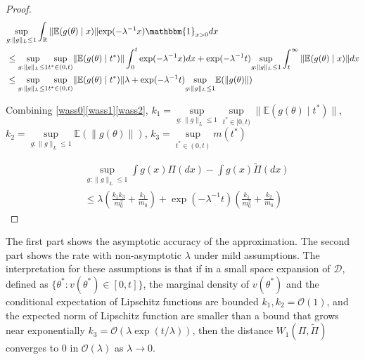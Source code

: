 \documentclass[10pt,fleqn]{article}
\newcommand{\mc}[1]{\mathcal{#1}}
\DeclareMathOperator{\1}{\mathbbm{1}}
\begin{document}
\begin{proof}[Proof]
\begin{equation}
\label{wass2}
\begin{aligned}
& \underset{g:\|g\|_L\le 1}\sup\int_\mathbb{R}  \|\mathbb{E}(g(\theta) \mid x)\| { \exp(- \lambda^{-1} x)}  \mathbbm{1}_{x > 0} d x \\
&\le \underset{g:\|g\|_L\le 1}\sup\underset{t^*\in (0,t)}\sup \|\mathbb{E}(g(\theta) \mid t^*)\|     
\int_0^{t} \exp(- \lambda^{-1} x ) dx + \exp(- \lambda^{-1} t ) \underset{g:\|g\|_L\le 1}\sup \int_t^{\infty}   \|\mathbb{E}( g(\theta )\mid x)\| dx \\
&\le \underset{g:\|g\|_L\le 1}\sup\underset{t^*\in (0,t)}\sup \|\mathbb{E}(g(\theta) \mid t^*)\|     \lambda + \exp(- \lambda^{-1} t ) \underset{g:\|g\|_L\le 1} \sup \mathbb{E}(\| g(\theta )\|) \\
\end{aligned}
\end{equation}

Combining \eqref{wass0}\eqref{wass1}\eqref{wass2}, $k_1=\underset{g:\|g\|_L\le 1}\sup\underset{t^*\in [0,t)}\sup \|\mathbb{E}(g(\theta) \mid t^*)\|$, $k_2=\underset{g:\|g\|_L\le 1} \sup \mathbb{E}(\| g(\theta )\|)$, $k_3= \underset{t^*\in (0,t)}\sup  m(t^{*})$


\begin{equation}
\begin{aligned}
& \underset{g:\|g\|_L\le 1}\sup \int g(x) \Pi(dx) -  \int g(x) \tilde\Pi(dx) \\
        & \le \lambda (\frac{k_1 k_3}{m_0^2} + \frac{k_1}{m_0}) + \exp(- \lambda^{-1} t )(\frac{k_1}{m_0^2} + \frac{k_2}{m_0})
        \end{aligned}
        \end{equation}


        \end{proof}

        


The first part shows the asymptotic accuracy of the approximation. The second part shows the rate with non-asymptotic $\lambda$ under mild assumptions. The interpretation for these assumptions is that if in a small space expansion of $\mc D$, defined as $\{\theta^*: v(\theta^*)\in [0,t] \}$, the marginal density of $v(\theta^*)$ and the conditional expectation of Lipschitz functions are bounded $k_1,k_2= \mc O(1)$, and the expected norm of Lipschitz function are smaller than a bound that grows near exponentially $k_3 = \mc O(\lambda \exp(t/\lambda))$, then the distance $W_1(\Pi,\tilde\Pi)$ converges to $0$ in $\mc O(\lambda)$ as $\lambda\rightarrow 0$.
\end{document}
